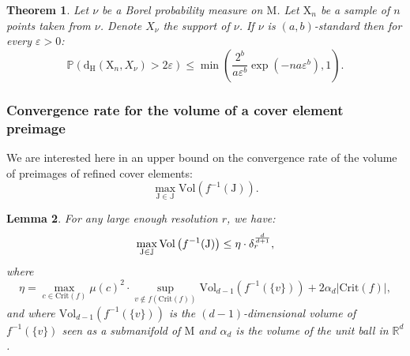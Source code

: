 \documentclass[pdflatex,sn-mathphys-ay]{sn-jnl}%
\newtheorem{theorem}{Theorem}[section]
\newtheorem{lemma}[theorem]{Lemma}
\newcommand{\spa}{X}
\newcommand{\man}{\mathrm{M}}
\newcommand{\sample}{\mathrm{X}}
\newcommand{\critic}{{\mathrm {Crit}}}
\newcommand{\haus}{{\mathrm {d_H}}}
\newcommand{\vol}{\mathrm{Vol}}
\newcommand{\coverwidth}{\change{\delta_r}}
\newcommand{\R}{\mathbb{R}}
\newcommand{\eps}{\varepsilon}
\newcommand{\preim}[2]{#1^{-1}(#2)}
\newcommand{\change}[1]{\noindent #1}
\theoremstyle{thmstyleone}%
\begin{document}
 \begin{theorem}\label{thm:ab}
 Let $\nu$ be a Borel probability measure on $\man$. Let $\sample_n$ be a sample of $n$ points taken from $\nu$. Denote $\spa_\nu$ the support of $\nu$. 
 If $\nu$ is $(a,b)$-standard then for every $\eps>0$:
 $$\mathbb{P}\left(\haus(\sample_n,\spa_\nu)>2\eps\right)\leq\min\left(\frac{2^b}{a\eps^b}\exp(-na\eps^b),1\right).$$
 \end{theorem}

\subsubsection{Convergence rate for the volume of a cover element preimage}
We are interested here in an upper bound on the convergence rate of the volume of preimages of refined cover elements:
$$\max_{\mathrm{J}\in\mathbb{J}}\vol\left( \preim{f}{\mathrm{J}}\right).$$
\begin{lemma}\label{lem:meas}
For any large enough resolution $r$, we have:
$$\max_{\mathrm{J}\in\mathbb{J}}\vol\left( \preim{f}{\mathrm{J}}\right)\leq \eta\cdot\coverwidth^{\frac{d}{d+1}},$$
where
$$\eta=\max_{c\in\critic(f)}\mu(c)^2\cdot\sup_{v\notin f(\critic(f))}\vol_{d-1}\left(\preim{f}{\{v\}}\right)+2\alpha_d\left|\critic(f)\right|,$$
and where $\vol_{d-1}\left(\preim{f}{\{v\}}\right)$ is the $(d-1)$-dimensional volume of $\preim{f}{\{v\}}$ seen as a submanifold of $\man$ and $\alpha_d$ is the volume of the unit ball in $\R^d$.

\end{lemma}
\end{document}
